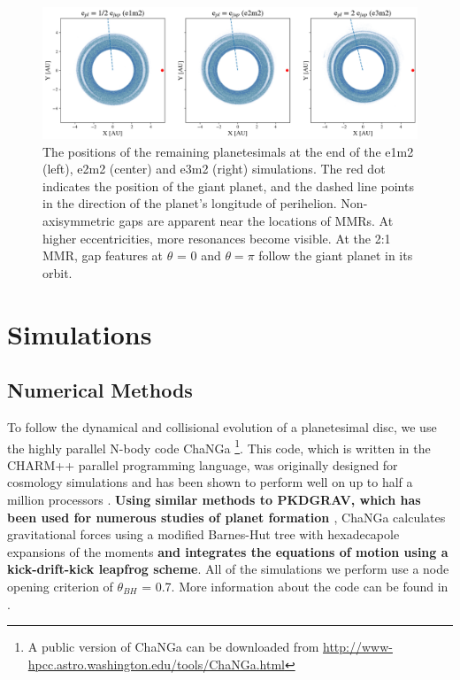 \documentclass[fleqn,usenatbib]{mnras}
\begin{document}
\begin{figure}
\begin{center}
    \includegraphics[width=\textwidth]{figures/xy.png}
    \caption{The positions of the remaining planetesimals at the end of the e1m2 (left), e2m2 (center) and e3m2 (right) simulations. The red dot 
    indicates the position of the giant planet, and the dashed line points in the direction of the planet's longitude of perihelion. Non-axisymmetric gaps 
    are apparent near the locations of MMRs. At higher eccentricities, more resonances become visible. At the 2:1 MMR, gap features at $\theta$ = 0 
    and $\theta = \pi$ follow the giant planet in its orbit.\label{fig:xy}}
\end{center}
\end{figure}

\section{Simulations} \label{sec:sims}

\subsection{Numerical Methods}\label{sec:methods}

To follow the dynamical and collisional evolution of a planetesimal disc, we use the highly parallel N-body code {\sc ChaNGa} 
\footnote{A public version of {\sc ChaNGa} can be downloaded from \url{http://www-hpcc.astro.washington.edu/tools/ChaNGa.html}}. 
This code, which is written in the {\sc CHARM++} parallel programming language, was originally designed for cosmology simulations 
and has been shown to perform well on up to half a million processors \citep{2015AphCom..2..1}. \textbf{Using similar methods to {\sc PKDGRAV}, which has been used for numerous 
studies of planet formation \citep{2000Icar..143...45R, 2005ApJ...625..427L, 2013ApJ...777L..31D, 2015ApJ...806...23L}}, {\sc ChaNGa} calculates 
gravitational forces using a modified Barnes-Hut \citep{1986Natur.324..446B} tree with hexadecapole expansions of the moments \textbf{and integrates the equations of motion using a 
kick-drift-kick leapfrog scheme}. All of the simulations we perform use a node opening criterion of $\theta_{BH}$ = 0.7. More information about the code can be found in 
\citet{2008IEEEpds...ChaNGa}.
\end{document}
